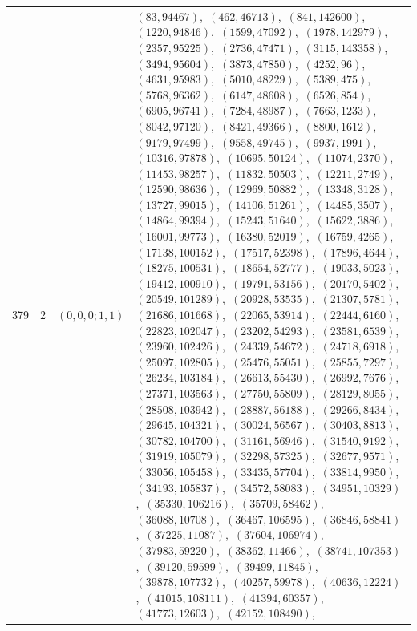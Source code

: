 \documentclass[11pt]{article}
\begin{document}
\begin{longtable}{@{}rrl>{\raggedright\arraybackslash}p{}@{}}
379 & 2 & $(0,0,0;1,1)$ & $(83,94467)$,\allowbreak\ $(462,46713)$,\allowbreak\ $(841,142600)$,\allowbreak\ $(1220,94846)$,\allowbreak\ $(1599,47092)$,\allowbreak\ $(1978,142979)$,\allowbreak\ $(2357,95225)$,\allowbreak\ $(2736,47471)$,\allowbreak\ $(3115,143358)$,\allowbreak\ $(3494,95604)$,\allowbreak\ $(3873,47850)$,\allowbreak\ $(4252,96)$,\allowbreak\ $(4631,95983)$,\allowbreak\ $(5010,48229)$,\allowbreak\ $(5389,475)$,\allowbreak\ $(5768,96362)$,\allowbreak\ $(6147,48608)$,\allowbreak\ $(6526,854)$,\allowbreak\ $(6905,96741)$,\allowbreak\ $(7284,48987)$,\allowbreak\ $(7663,1233)$,\allowbreak\ $(8042,97120)$,\allowbreak\ $(8421,49366)$,\allowbreak\ $(8800,1612)$,\allowbreak\ $(9179,97499)$,\allowbreak\ $(9558,49745)$,\allowbreak\ $(9937,1991)$,\allowbreak\ $(10316,97878)$,\allowbreak\ $(10695,50124)$,\allowbreak\ $(11074,2370)$,\allowbreak\ $(11453,98257)$,\allowbreak\ $(11832,50503)$,\allowbreak\ $(12211,2749)$,\allowbreak\ $(12590,98636)$,\allowbreak\ $(12969,50882)$,\allowbreak\ $(13348,3128)$,\allowbreak\ $(13727,99015)$,\allowbreak\ $(14106,51261)$,\allowbreak\ $(14485,3507)$,\allowbreak\ $(14864,99394)$,\allowbreak\ $(15243,51640)$,\allowbreak\ $(15622,3886)$,\allowbreak\ $(16001,99773)$,\allowbreak\ $(16380,52019)$,\allowbreak\ $(16759,4265)$,\allowbreak\ $(17138,100152)$,\allowbreak\ $(17517,52398)$,\allowbreak\ $(17896,4644)$,\allowbreak\ $(18275,100531)$,\allowbreak\ $(18654,52777)$,\allowbreak\ $(19033,5023)$,\allowbreak\ $(19412,100910)$,\allowbreak\ $(19791,53156)$,\allowbreak\ $(20170,5402)$,\allowbreak\ $(20549,101289)$,\allowbreak\ $(20928,53535)$,\allowbreak\ $(21307,5781)$,\allowbreak\ $(21686,101668)$,\allowbreak\ $(22065,53914)$,\allowbreak\ $(22444,6160)$,\allowbreak\ $(22823,102047)$,\allowbreak\ $(23202,54293)$,\allowbreak\ $(23581,6539)$,\allowbreak\ $(23960,102426)$,\allowbreak\ $(24339,54672)$,\allowbreak\ $(24718,6918)$,\allowbreak\ $(25097,102805)$,\allowbreak\ $(25476,55051)$,\allowbreak\ $(25855,7297)$,\allowbreak\ $(26234,103184)$,\allowbreak\ $(26613,55430)$,\allowbreak\ $(26992,7676)$,\allowbreak\ $(27371,103563)$,\allowbreak\ $(27750,55809)$,\allowbreak\ $(28129,8055)$,\allowbreak\ $(28508,103942)$,\allowbreak\ $(28887,56188)$,\allowbreak\ $(29266,8434)$,\allowbreak\ $(29645,104321)$,\allowbreak\ $(30024,56567)$,\allowbreak\ $(30403,8813)$,\allowbreak\ $(30782,104700)$,\allowbreak\ $(31161,56946)$,\allowbreak\ $(31540,9192)$,\allowbreak\ $(31919,105079)$,\allowbreak\ $(32298,57325)$,\allowbreak\ $(32677,9571)$,\allowbreak\ $(33056,105458)$,\allowbreak\ $(33435,57704)$,\allowbreak\ $(33814,9950)$,\allowbreak\ $(34193,105837)$,\allowbreak\ $(34572,58083)$,\allowbreak\ $(34951,10329)$,\allowbreak\ $(35330,106216)$,\allowbreak\ $(35709,58462)$,\allowbreak\ $(36088,10708)$,\allowbreak\ $(36467,106595)$,\allowbreak\ $(36846,58841)$,\allowbreak\ $(37225,11087)$,\allowbreak\ $(37604,106974)$,\allowbreak\ $(37983,59220)$,\allowbreak\ $(38362,11466)$,\allowbreak\ $(38741,107353)$,\allowbreak\ $(39120,59599)$,\allowbreak\ $(39499,11845)$,\allowbreak\ $(39878,107732)$,\allowbreak\ $(40257,59978)$,\allowbreak\ $(40636,12224)$,\allowbreak\ $(41015,108111)$,\allowbreak\ $(41394,60357)$,\allowbreak\ $(41773,12603)$,\allowbreak\ $(42152,108490)$,\allowbreak\ 
\end{longtable}
\end{document}
